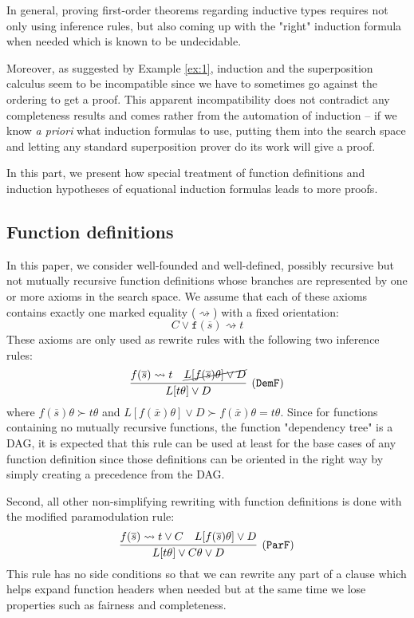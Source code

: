 
In general, proving first-order theorems regarding inductive types requires not only using inference rules, but also coming up with the "right" induction formula when needed which is known to be undecidable.

Moreover, as suggested by Example \ref{ex:1}, induction and the superposition calculus seem to be incompatible since we have to sometimes go against the ordering to get a proof. This apparent incompatibility does not contradict any completeness results and comes rather from the automation of induction -- if we know \textit{a priori} what induction formulas to use, putting them into the search space and letting any standard superposition prover do its work will give a proof.

In this part, we present how special treatment of function definitions and induction hypotheses of equational induction formulas leads to more proofs.

\subsection{Function definitions}
In this paper, we consider well-founded and well-defined, possibly recursive but not mutually recursive function definitions whose branches are represented by one or more axioms in the search space. We assume that each of these axioms contains exactly one marked equality ($\rightsquigarrow$) with a fixed orientation:
$$C\lor \mathtt{f}(\overline{s}) \rightsquigarrow t$$
These axioms are only used as rewrite rules with the following two inference rules:
\begin{equation}
\infer[\small{(\mathtt{DemF})}]{L[t\theta]\lor D}
{f(\overline{s})\rightsquigarrow t & \cancel{L[f(\overline{s})\theta]\lor D}}
\end{equation}
where $f(\overline{s})\theta\succ t\theta$ and $L[f(\overline{x})\theta]\lor D\succ f(\overline{x})\theta=t\theta$. Since for functions containing no mutually recursive functions, the function "dependency tree" is a DAG, it is expected that this rule can be used at least for the base cases of any function definition since those definitions can be oriented in the right way by simply creating a precedence from the DAG.

Second, all other non-simplifying rewriting with function definitions is done with the modified paramodulation rule:
\begin{equation}
\infer[\small{(\mathtt{ParF})}]{L[t\theta]\lor C\theta\lor D}{f(\overline{s})\rightsquigarrow t\lor C & L[f(\overline{s})\theta]\lor D}
\end{equation}
This rule has no side conditions so that we can rewrite any part of a clause which helps expand function headers when needed but at the same time we lose properties such as fairness and completeness.

